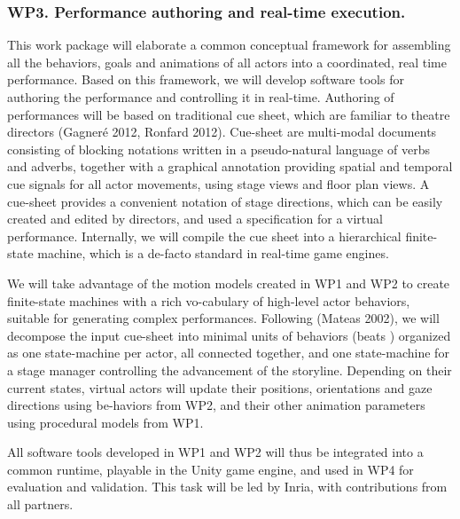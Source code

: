 
\subsubsection{WP3. Performance authoring and real-time execution. }

This work package will elaborate a common conceptual framework for assembling all the behaviors, goals and animations of all actors into a coordinated, real time performance. Based on this framework, we will develop software tools for authoring the performance and controlling it in real-time. Authoring of performances will be based on traditional cue sheet, which are familiar to theatre directors (Gagner\'e 2012, Ronfard 2012). Cue-sheet are multi-modal documents consisting of blocking notations  written in a pseudo-natural language of verbs and adverbs, together with a graphical annotation providing spatial and temporal cue signals  for all actor movements, using stage views and floor plan views. A cue-sheet provides a convenient notation of stage directions, which can be easily created and edited by directors, and used a specification for a virtual performance. Internally, we will compile the cue sheet into a hierarchical finite-state machine, which is a de-facto standard in real-time game engines. 

We will take advantage of the motion models created in WP1 and WP2 to create finite-state machines with a rich vo-cabulary of high-level actor behaviors, suitable for generating complex performances. Following (Mateas 2002), we will decompose the input cue-sheet into minimal units of behaviors (beats ) organized as one state-machine per actor, all connected together, and one state-machine for a stage manager  controlling the advancement of the storyline. Depending on their current states, virtual actors will update their positions, orientations and gaze directions using be-haviors from WP2, and their other animation parameters using procedural models from WP1. 

All software tools developed in WP1 and WP2 will thus be integrated into a common runtime, playable in the Unity game engine, and used in WP4 for evaluation and validation. This task will be led by Inria, with contributions from all partners.

\endinput

